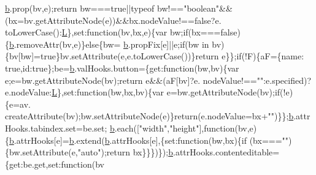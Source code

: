 \begin{DoxyCode}
      \hyperlink{docs_2_programmer's_manual_2html_2jquery_8js_aa4026ad5544b958e54ce5e106fa1c805}{b}.prop(bv,e);\textcolor{keywordflow}{return} bw===\textcolor{keyword}{true}||typeof bw!==\textcolor{stringliteral}{"boolean"}&&(bx=bv.getAttributeNode(e))&&bx.nodeValue!==\textcolor{keyword}{false}?e.
      toLowerCase():\hyperlink{docs_2_programmer's_manual_2html_2jquery_8js_a38ee4c0b5f4fe2a18d0c783af540d253}{L}\},set:\textcolor{keyword}{function}(bv,bx,e)\{var bw;\textcolor{keywordflow}{if}(bx===\textcolor{keyword}{false})\{\hyperlink{docs_2_programmer's_manual_2html_2jquery_8js_aa4026ad5544b958e54ce5e106fa1c805}{b}.removeAttr(bv,e)\}\textcolor{keywordflow}{else}\{bw=
      \hyperlink{docs_2_programmer's_manual_2html_2jquery_8js_aa4026ad5544b958e54ce5e106fa1c805}{b}.propFix[e]||e;\textcolor{keywordflow}{if}(bw in bv)\{bv[bw]=\textcolor{keyword}{true}\}bv.setAttribute(e,e.toLowerCase())\}\textcolor{keywordflow}{return} e\}\};\textcolor{keywordflow}{if}(!F)\{aF=\{name:\textcolor{keyword}{
      true},\textcolor{keywordtype}{id}:\textcolor{keyword}{true}\};be=\hyperlink{docs_2_programmer's_manual_2html_2jquery_8js_aa4026ad5544b958e54ce5e106fa1c805}{b}.valHooks.button=\{\textcolor{keyword}{get}:\textcolor{keyword}{function}(bw,bv)\{var e;e=bw.getAttributeNode(bv);\textcolor{keywordflow}{return} e&&(aF[bv]?e.
      nodeValue!==\textcolor{stringliteral}{""}:e.specified)?e.nodeValue:\hyperlink{docs_2_programmer's_manual_2html_2jquery_8js_a38ee4c0b5f4fe2a18d0c783af540d253}{L}\},set:\textcolor{keyword}{function}(bw,bx,bv)\{var e=bw.getAttributeNode(bv);\textcolor{keywordflow}{if}(!e)\{e=av.
      createAttribute(bv);bw.setAttributeNode(e)\}\textcolor{keywordflow}{return}(e.nodeValue=bx+\textcolor{stringliteral}{""})\}\};\hyperlink{docs_2_programmer's_manual_2html_2jquery_8js_aa4026ad5544b958e54ce5e106fa1c805}{b}.attrHooks.tabindex.set=be.set;
      \hyperlink{docs_2_programmer's_manual_2html_2jquery_8js_aa4026ad5544b958e54ce5e106fa1c805}{b}.each([\textcolor{stringliteral}{"width"},\textcolor{stringliteral}{"height"}],\textcolor{keyword}{function}(bv,e)\{\hyperlink{docs_2_programmer's_manual_2html_2jquery_8js_aa4026ad5544b958e54ce5e106fa1c805}{b}.attrHooks[e]=\hyperlink{docs_2_programmer's_manual_2html_2jquery_8js_aa4026ad5544b958e54ce5e106fa1c805}{b}.extend(\hyperlink{docs_2_programmer's_manual_2html_2jquery_8js_aa4026ad5544b958e54ce5e106fa1c805}{b}.attrHooks[e],\{set:function(bw,bx)\{if
      (bx===\textcolor{stringliteral}{""})\{bw.setAttribute(e,\textcolor{stringliteral}{"auto"});return bx\}\}\})\});\hyperlink{docs_2_programmer's_manual_2html_2jquery_8js_aa4026ad5544b958e54ce5e106fa1c805}{b}.attrHooks.contenteditable=\{\textcolor{keyword}{get}:be.get,set:\textcolor{keyword}{function}(bv

\end{DoxyCode}

